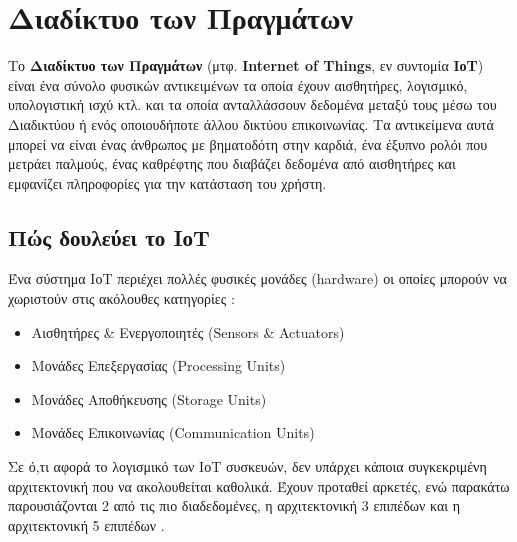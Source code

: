 \section{Διαδίκτυο των Πραγμάτων}
\label{sec:iot}
Το \textbf{Διαδίκτυο των Πραγμάτων} (μτφ. \textbf{Internet of Things}, εν συντομία \textbf{ΙοΤ}) είναι ένα σύνολο φυσικών αντικειμένων τα οποία έχουν αισθητήρες, λογισμικό, υπολογιστική ισχύ κτλ. και τα οποία ανταλλάσσουν δεδομένα μεταξύ τους μέσω του Διαδικτύου ή ενός οποιουδήποτε άλλου δικτύου επικοινωνίας. Τα αντικείμενα αυτά μπορεί να είναι ένας άνθρωπος με βηματοδότη στην καρδιά, ένα έξυπνο ρολόι που μετράει παλμούς, ένας καθρέφτης που διαβάζει δεδομένα από αισθητήρες και εμφανίζει πληροφορίες για την κατάσταση του χρήστη.

\subsection{Πώς δουλεύει το ΙοΤ}
Ένα σύστημα ΙοΤ περιέχει πολλές φυσικές μονάδες (hardware) οι οποίες μπορούν να χωριστούν στις ακόλουθες κατηγορίες {\cite{chebudie}}:
\begin{itemize}
    \item Αισθητήρες \& Ενεργοποιητές (Sensors \& Actuators)
    \item Μονάδες Επεξεργασίας (Processing Units)
    \item Μονάδες Αποθήκευσης (Storage Units)
    \item Μονάδες Επικοινωνίας (Communication Units)
\end{itemize}

Σε ό,τι αφορά το λογισμικό των ΙοΤ συσκευών, δεν υπάρχει κάποια συγκεκριμένη αρχιτεκτονική που να ακολουθείται καθολικά. Έχουν προταθεί αρκετές, ενώ παρακάτω παρουσιάζονται 2 από τις πιο διαδεδομένες, η αρχιτεκτονική 3 επιπέδων και η αρχιτεκτονική 5 επιπέδων \cite{sethi}.

